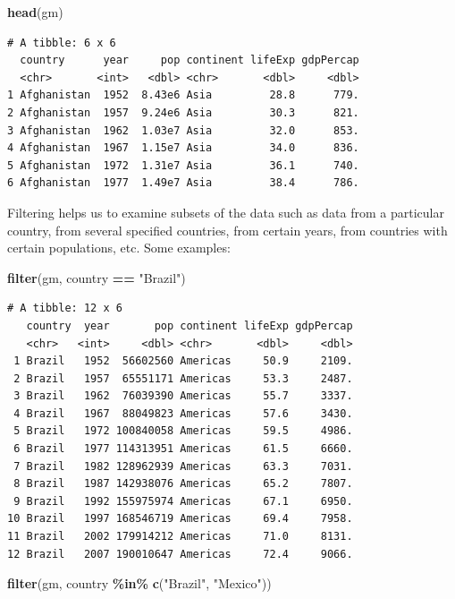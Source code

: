 \documentclass[
]{krantz}
\makeatletter
\newenvironment{Shaded}{\begin{snugshade}}{\end{snugshade}}
\newcommand{\KeywordTok}[1]{\textcolor[rgb]{0.27,0.27,0.27}{\textbf{#1}}}
\newcommand{\NormalTok}[1]{#1}
\newcommand{\OperatorTok}[1]{\textcolor[rgb]{0.43,0.43,0.43}{\textbf{#1}}}
\newcommand{\StringTok}[1]{\textcolor[rgb]{0.5,0.5,0.5}{#1}}
\newenvironment{kframe}{%
\medskip{}
\setlength{\fboxsep}{.8em}
 \def\at@end@of@kframe{}%
 \ifinner\ifhmode%
  \def\at@end@of@kframe{\end{minipage}}%
  \begin{minipage}{\columnwidth}%
 \fi\fi%
 \def\FrameCommand##1{\hskip\@totalleftmargin \hskip-\fboxsep
 \colorbox{shadecolor}{##1}\hskip-\fboxsep
     \hskip-\linewidth \hskip-\@totalleftmargin \hskip\columnwidth}%
 \MakeFramed {\advance\hsize-\width
   \@totalleftmargin\z@ \linewidth\hsize
   \@setminipage}}%
 {\par\unskip\endMakeFramed%
 \at@end@of@kframe}
\renewenvironment{Shaded}{\begin{kframe}}{\end{kframe}}
\makeatother
\begin{document}
\begin{Shaded}
\begin{Highlighting}[]
\KeywordTok{head}\NormalTok{(gm)}
\end{Highlighting}
\end{Shaded}

\begin{verbatim}
# A tibble: 6 x 6
  country      year     pop continent lifeExp gdpPercap
  <chr>       <int>   <dbl> <chr>       <dbl>     <dbl>
1 Afghanistan  1952  8.43e6 Asia         28.8      779.
2 Afghanistan  1957  9.24e6 Asia         30.3      821.
3 Afghanistan  1962  1.03e7 Asia         32.0      853.
4 Afghanistan  1967  1.15e7 Asia         34.0      836.
5 Afghanistan  1972  1.31e7 Asia         36.1      740.
6 Afghanistan  1977  1.49e7 Asia         38.4      786.
\end{verbatim}

Filtering helps us to examine subsets of the data such as data from a particular country, from several specified countries, from certain years, from countries with certain populations, etc. Some examples:

\begin{Shaded}
\begin{Highlighting}[]
\KeywordTok{filter}\NormalTok{(gm, country }\OperatorTok{==}\StringTok{ "Brazil"}\NormalTok{)}
\end{Highlighting}
\end{Shaded}

\begin{verbatim}
# A tibble: 12 x 6
   country  year       pop continent lifeExp gdpPercap
   <chr>   <int>     <dbl> <chr>       <dbl>     <dbl>
 1 Brazil   1952  56602560 Americas     50.9     2109.
 2 Brazil   1957  65551171 Americas     53.3     2487.
 3 Brazil   1962  76039390 Americas     55.7     3337.
 4 Brazil   1967  88049823 Americas     57.6     3430.
 5 Brazil   1972 100840058 Americas     59.5     4986.
 6 Brazil   1977 114313951 Americas     61.5     6660.
 7 Brazil   1982 128962939 Americas     63.3     7031.
 8 Brazil   1987 142938076 Americas     65.2     7807.
 9 Brazil   1992 155975974 Americas     67.1     6950.
10 Brazil   1997 168546719 Americas     69.4     7958.
11 Brazil   2002 179914212 Americas     71.0     8131.
12 Brazil   2007 190010647 Americas     72.4     9066.
\end{verbatim}

\begin{Shaded}
\begin{Highlighting}[]
\KeywordTok{filter}\NormalTok{(gm, country }\OperatorTok{\%in\%}\StringTok{ }\KeywordTok{c}\NormalTok{(}\StringTok{"Brazil"}\NormalTok{, }\StringTok{"Mexico"}\NormalTok{))}
\end{Highlighting}
\end{Shaded}
\end{document}

